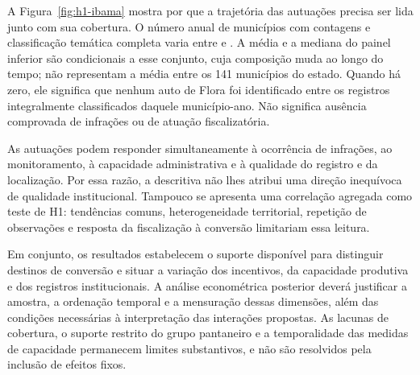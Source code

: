 A Figura~\ref{fig:h1-ibama} mostra por que a trajetória das autuações precisa ser lida junto com sua cobertura. O número anual de municípios com contagens e classificação temática completa varia entre \HibMin{} e \HibMax{}. A média e a mediana do painel inferior são condicionais a esse conjunto, cuja composição muda ao longo do tempo; não representam a média entre os 141 municípios do estado. Quando há zero, ele significa que nenhum auto de Flora foi identificado entre os registros integralmente classificados daquele município-ano. Não significa ausência comprovada de infrações ou de atuação fiscalizatória.

As autuações podem responder simultaneamente à ocorrência de infrações, ao monitoramento, à capacidade administrativa e à qualidade do registro e da localização. Por essa razão, a descritiva não lhes atribui uma direção inequívoca de qualidade institucional. Tampouco se apresenta uma correlação agregada como teste de H1: tendências comuns, heterogeneidade territorial, repetição de observações e resposta da fiscalização à conversão limitariam essa leitura.

Em conjunto, os resultados estabelecem o suporte disponível para distinguir destinos de conversão e situar a variação dos incentivos, da capacidade produtiva e dos registros institucionais. A análise econométrica posterior deverá justificar a amostra, a ordenação temporal e a mensuração dessas dimensões, além das condições necessárias à interpretação das interações propostas. As lacunas de cobertura, o suporte restrito do grupo pantaneiro e a temporalidade das medidas de capacidade permanecem limites substantivos, e não são resolvidos pela inclusão de efeitos fixos.
\FloatBarrier
